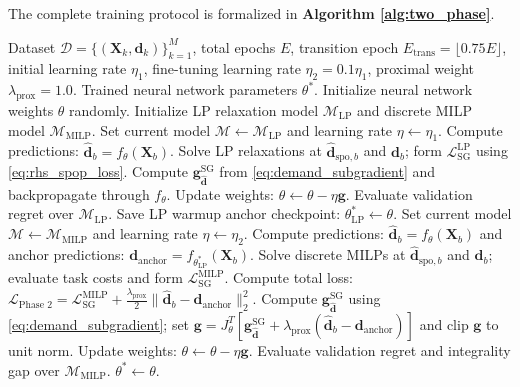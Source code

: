 \documentclass[11pt,a4paper]{article}
\theoremstyle{definition}
\theoremstyle{remark}
\begin{document}
The complete training protocol is formalized in \textbf{Algorithm \ref{alg:two_phase}}.

\begin{algorithm}[H]
\caption{Two-Phase DFL Training with LP Warmup and Proximal Trust-Region MILP Fine-Tuning}
\label{alg:two_phase}
\begin{algorithmic}[1]
\Require Dataset $\mathcal{D} = \{(\mathbf{X}_k, \mathbf{d}_k)\}_{k=1}^M$, total epochs $E$, transition epoch $E_{\text{trans}} = \lfloor 0.75 E \rfloor$, initial learning rate $\eta_1$, fine-tuning learning rate $\eta_2 = 0.1 \eta_1$, proximal weight $\lambda_{\text{prox}} = 1.0$.
\Ensure Trained neural network parameters $\theta^*$.
\State Initialize neural network weights $\theta$ randomly.
\State Initialize LP relaxation model $\mathcal{M}_{\text{LP}}$ and discrete MILP model $\mathcal{M}_{\text{MILP}}$.
\Statex {}
    \State Set current model $\mathcal{M} \leftarrow \mathcal{M}_{\text{LP}}$ and learning rate $\eta \leftarrow \eta_1$.
        \State Compute predictions: $\hat{\mathbf{d}}_b = f_\theta(\mathbf{X}_b)$.
        \State Solve LP relaxations at $\hat{\mathbf{d}}_{\text{spo},b}$ and $\mathbf{d}_b$; form $\mathcal{L}_{\text{SG}}^{\text{LP}}$ using \eqref{eq:rhs_spop_loss}.
        \State Compute $\mathbf{g}_{\hat{\mathbf{d}}}^{\text{SG}}$ from \eqref{eq:demand_subgradient} and backpropagate through $f_\theta$.
        \State Update weights: $\theta \leftarrow \theta - \eta \mathbf{g}$.
    \EndFor
    \State Evaluate validation regret over $\mathcal{M}_{\text{LP}}$.
\EndFor
\State Save LP warmup anchor checkpoint: $\theta_{\text{LP}}^* \leftarrow \theta$.
\Statex {}
    \State Set current model $\mathcal{M} \leftarrow \mathcal{M}_{\text{MILP}}$ and learning rate $\eta \leftarrow \eta_2$.
        \State Compute predictions: $\hat{\mathbf{d}}_b = f_\theta(\mathbf{X}_b)$ and anchor predictions: $\mathbf{d}_{\text{anchor}} = f_{\theta_{\text{LP}}^*}(\mathbf{X}_b)$.
        \State Solve discrete MILPs at $\hat{\mathbf{d}}_{\text{spo},b}$ and $\mathbf{d}_b$; evaluate task costs and form $\mathcal{L}_{\text{SG}}^{\text{MILP}}$.
        \State Compute total loss: $\mathcal{L}_{\text{Phase 2}} = \mathcal{L}_{\text{SG}}^{\text{MILP}} + \frac{\lambda_{\text{prox}}}{2} \|\hat{\mathbf{d}}_b - \mathbf{d}_{\text{anchor}}\|_2^2$.
        \State Compute $\mathbf{g}_{\hat{\mathbf{d}}}^{\text{SG}}$ using \eqref{eq:demand_subgradient}; set $\mathbf{g}=J_\theta^T[\mathbf{g}_{\hat{\mathbf{d}}}^{\text{SG}}+\lambda_{\text{prox}}(\hat{\mathbf{d}}_b-\mathbf{d}_{\text{anchor}})]$ and clip $\mathbf{g}$ to unit norm.
        \State Update weights: $\theta \leftarrow \theta - \eta \mathbf{g}$.
    \EndFor
    \State Evaluate validation regret and integrality gap over $\mathcal{M}_{\text{MILP}}$.
\EndFor
\State \Return $\theta^* \leftarrow \theta$.
\end{algorithmic}
\end{algorithm}
\end{document}
